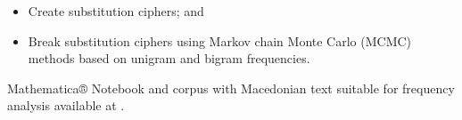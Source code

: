 \documentclass[%
version=last,%
fontsize=11pt,%
paper=A4,%
headinclude=false,%
footinclude=false,%
headlines=0,%
footlines=0,%
areasetadvanced,%
toc=bibnumbered,%
]{scrartcl}%
\begin{document}
\begin{minipage}[t]{.4\textwidth}
\begin{description}
    \begin{itemize}%
      [%
      nosep,
      leftmargin=*,%
      before=\leavevmode\vspace*{-\dimexpr2\topsep+\baselineskip\relax},%
      ]
    \item Create substitution ciphers; and
    \item Break substitution ciphers using Markov chain Monte Carlo (MCMC)
      methods based on unigram and bigram frequencies.
    \end{itemize}
    Mathematica® Notebook and corpus with Macedonian text suitable for frequency
    analysis available at .
  \end{description}
\end{minipage}
\end{document}
